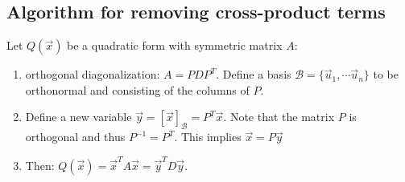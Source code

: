 \documentclass[11pt, a4paper]{article}
\begin{document}
\subsection{Algorithm for removing cross-product terms}
Let $Q(\vec{x})$ be a quadratic form with symmetric matrix $A$:
\begin{enumerate}
  \item orthogonal diagonalization: $A = PDP^T$. Define a basis $\mathcal{B} = \{ \vec{u}_1, \cdots \vec{u}_n\}$ to be orthonormal and consisting of the columns of $P$.
  \item Define a new variable $\vec{y} = [\vec{x}]_\mathcal{B} = P^T\vec{x}$. Note that the matrix $P$ is orthogonal and thus $P^{-1} = P^T$. This implies $\vec{x} = P\vec{y}$
  \item Then: $Q(\vec{x}) = \vec{x}^T A \vec{x} = \vec{y}^T D \vec{y}$.
\end{enumerate}
\end{document}
